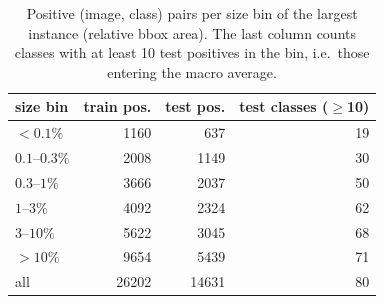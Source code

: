 \begin{table}[t]\centering\small
\begin{tabular}{lrrr}\toprule
size bin & train pos. & test pos. & test classes ($\geq$10) \\ \midrule
$<0.1\%$ & 1160 & 637 & 19 \\
$0.1$--$0.3\%$ & 2008 & 1149 & 30 \\
$0.3$--$1\%$ & 3666 & 2037 & 50 \\
$1$--$3\%$ & 4092 & 2324 & 62 \\
$3$--$10\%$ & 5622 & 3045 & 68 \\
$>10\%$ & 9654 & 5439 & 71 \\
\midrule all & 26202 & 14631 & 80 \\
\bottomrule\end{tabular}
\caption{Positive (image, class) pairs per size bin of the largest instance (relative bbox area). The last column counts classes with at least 10 test positives in the bin, i.e.\ those entering the macro average.}
\label{tab:data}\end{table}